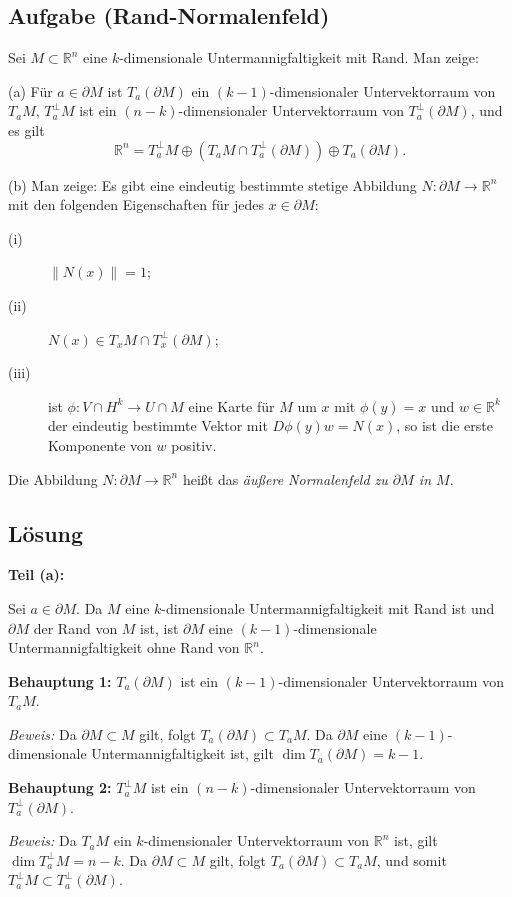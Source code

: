 \documentclass{article}
\newcommand{\R}{\mathbb{R}}
\newcommand{\del}{\partial}
\begin{document}
\subsection*{Aufgabe (Rand-Normalenfeld)}

Sei $M \subset \R^n$ eine $k$-dimensionale Untermannigfaltigkeit mit Rand. Man zeige:

(a) Für $a \in \del M$ ist $T_a(\del M)$ ein $(k-1)$-dimensionaler Untervektorraum von $T_a M$, $T_a^{\perp} M$ ist ein $(n-k)$-dimensionaler Untervektorraum von $T_a^{\perp}(\del M)$, und es gilt
\[
\R^n = T_a^{\perp} M \oplus (T_a M \cap T_a^{\perp}(\del M)) \oplus T_a(\del M).
\]

(b) Man zeige: Es gibt eine eindeutig bestimmte stetige Abbildung $N: \del M \to \R^n$ mit den folgenden Eigenschaften für jedes $x \in \del M$:
\begin{description}
\item[(i)] $\|N(x)\| = 1$;
\item[(ii)] $N(x) \in T_x M \cap T_x^{\perp}(\del M)$;
\item[(iii)] ist $\phi: V \cap H^k \to U \cap M$ eine Karte für $M$ um $x$ mit $\phi(y) = x$ und $w \in \R^k$ der eindeutig bestimmte Vektor mit $D\phi(y)w = N(x)$, so ist die erste Komponente von $w$ positiv.
\end{description}

Die Abbildung $N: \del M \to \R^n$ heißt das \emph{äußere Normalenfeld zu $\del M$ in $M$}.

\subsection*{Lösung}

\textbf{Teil (a):}

Sei $a \in \del M$. Da $M$ eine $k$-dimensionale Untermannigfaltigkeit mit Rand ist und $\del M$ der Rand von $M$ ist, ist $\del M$ eine $(k-1)$-dimensionale Untermannigfaltigkeit ohne Rand von $\R^n$.

\textbf{Behauptung 1:} $T_a(\del M)$ ist ein $(k-1)$-dimensionaler Untervektorraum von $T_a M$.

\textit{Beweis:} Da $\del M \subset M$ gilt, folgt $T_a(\del M) \subset T_a M$. Da $\del M$ eine $(k-1)$-dimensionale Untermannigfaltigkeit ist, gilt $\dim T_a(\del M) = k-1$.

\textbf{Behauptung 2:} $T_a^{\perp} M$ ist ein $(n-k)$-dimensionaler Untervektorraum von $T_a^{\perp}(\del M)$.

\textit{Beweis:} Da $T_a M$ ein $k$-dimensionaler Untervektorraum von $\R^n$ ist, gilt $\dim T_a^{\perp} M = n-k$. Da $\del M \subset M$ gilt, folgt $T_a(\del M) \subset T_a M$, und somit $T_a^{\perp} M \subset T_a^{\perp}(\del M)$.
\end{document}
